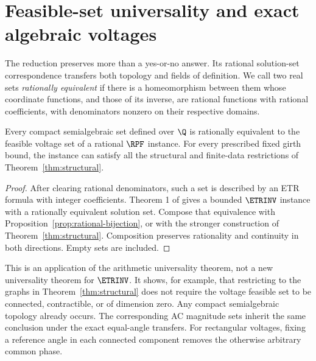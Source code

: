 \section{Feasible-set universality and exact algebraic voltages}
\label{sec:algebraic}

The reduction preserves more than a yes-or-no answer. Its rational
solution-set correspondence transfers both topology and fields of definition.
We call two real sets \emph{rationally equivalent} if there is a
homeomorphism between them whose coordinate functions, and those of its
inverse, are rational functions with rational coefficients, with denominators
nonzero on their respective domains.

\begin{theorem}
\label{thm:universality}
Every compact semialgebraic set defined over $\Q$ is rationally equivalent
to the feasible voltage set of a rational $\RPF$ instance.
For every prescribed fixed girth bound, the instance can satisfy all the
structural and finite-data restrictions of Theorem~\ref{thm:structural}.
\end{theorem}
\begin{proof}
After clearing rational denominators, such a set is described by an ETR
formula with integer coefficients. Theorem 1 of
\citet{AbrahamsenMiltzow2019} gives a bounded $\ETRINV$ instance with a
rationally equivalent solution set. Compose that equivalence with
Proposition~\ref{prop:rational-bijection}, or with the stronger construction
of Theorem~\ref{thm:structural}. Composition preserves rationality and
continuity in both directions. Empty sets are included.
\end{proof}

This is an application of the arithmetic universality theorem, not a new
universality theorem for $\ETRINV$. It shows, for example, that restricting
to the graphs in Theorem~\ref{thm:structural} does not require the voltage
feasible set to be connected, contractible, or of dimension zero. Any compact
semialgebraic topology already occurs. The corresponding AC magnitude sets
inherit the same conclusion under the exact equal-angle transfers. For
rectangular voltages, fixing a reference angle in each connected component
removes the otherwise arbitrary common phase.

